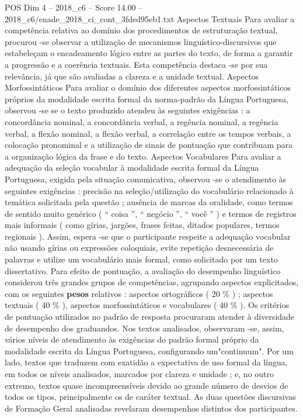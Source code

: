 \begin{textsample}{POS Dim 4 – 2018\_c6 – Score 14.00 – 2018\_c6/enade\_2018\_ci\_cont\_3fded95eb1.txt}
Aspectos Textuais Para avaliar a competência relativa ao domínio dos procedimentos de estruturação textual, procurou -se observar a utilização de mecanismos linguístico-discursivos que estabeleçam o encadeamento lógico entre as partes do texto, de forma a garantir a progressão e a coerência textuais.
Esta competência destaca -se por sua relevância, já que são avaliadas a clareza e a unidade textual.
Aspectos Morfossintáticos Para avaliar o domínio dos diferentes aspectos morfossintáticos próprios da modalidade escrita formal da norma-padrão da Língua Portuguesa, observou -se se o texto produzido atendeu às seguintes exigências : a concordância nominal, a concordância verbal, a regência nominal, a regência verbal, a flexão nominal, a flexão verbal, a correlação entre os tempos verbais, a colocação pronominal e a utilização de sinais de pontuação que contribuam para a organização lógica da frase e do texto.
Aspectos Vocabulares Para avaliar a adequação da seleção vocabular à modalidade escrita formal da Língua Portuguesa, exigida pela situação comunicativa, observou -se o atendimento às seguintes exigências : precisão na seleção/utilização do vocabulário relacionado à temática solicitada pela questão ; ausência de marcas da oralidade, como termos de sentido muito genérico ( “ coisa ”, “ negócio ”, “ você ” ) e termos de registros mais informais ( como gírias, jargões, frases feitas, ditados populares, termos regionais ).
Assim, espera -se que o participante respeite a adequação vocabular não usando gírias ou expressões coloquiais, evite repetição desnecessária de palavras e utilize um vocabulário mais formal, como solicitado por um texto dissertativo.
Para efeito de pontuação, a avaliação do desempenho linguístico considerou três grandes grupos de competências, agrupando aspectos explicitados, com os seguintes \textbf{pesos} relativos : aspectos ortográficos ( 20 \% ) ; aspectos textuais ( 40 \% ), aspectos morfossintáticos e vocabulares ( 40 \% ).
Os critérios de pontuação utilizados no padrão de resposta procuraram atender à diversidade de desempenho dos graduandos.
Nos textos analisados, observaram -se, assim, vários níveis de atendimento às exigências do padrão formal próprio da modalidade escrita da Língua Portuguesa, configurando um"continuum".
Por um lado, textos que traduzem com exatidão a expectativa de uso formal da língua, em todos os níveis analisados, marcados por clareza e unidade ; e, no outro extremo, textos quase incompreensíveis devido ao grande número de desvios de todos os tipos, principalmente os de caráter textual.
As duas questões discursivas de Formação Geral analisadas revelaram desempenhos distintos dos participantes.

\end{textsample}
